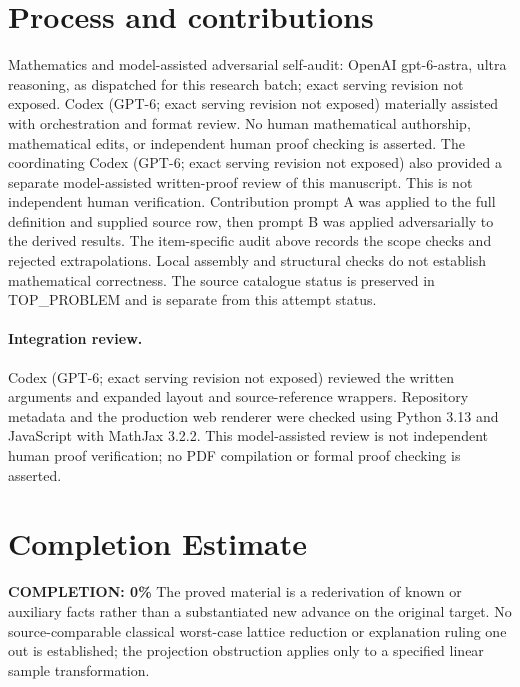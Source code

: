 \documentclass[11pt]{article}
\begin{document}
\section{Process and contributions}
Mathematics and model-assisted adversarial self-audit: OpenAI gpt-6-astra, ultra reasoning, as dispatched for this research batch; exact serving revision not exposed. Codex (GPT-6; exact serving revision not exposed) materially assisted with orchestration and format review. No human mathematical authorship, mathematical edits, or independent human proof checking is asserted.
The coordinating Codex (GPT-6; exact serving revision not exposed) also provided a separate model-assisted written-proof review of this manuscript. This is not independent human verification.
Contribution prompt A was applied to the full definition and supplied source row, then prompt B was applied adversarially to the derived results. The item-specific audit above records the scope checks and rejected extrapolations. Local assembly and structural checks do not establish mathematical correctness. The source catalogue status is preserved in TOP\_PROBLEM and is separate from this attempt status.
\paragraph{Integration review.} Codex (GPT-6; exact serving revision not exposed) reviewed the written arguments and expanded layout and source-reference wrappers. Repository metadata and the production web renderer were checked using Python 3.13 and JavaScript with MathJax 3.2.2. This model-assisted review is not independent human proof verification; no PDF compilation or formal proof checking is asserted.

\section{Completion Estimate}
\noindent\textbf{COMPLETION: 0\%}
The proved material is a rederivation of known or auxiliary facts rather than a substantiated new advance on the original target. No source-comparable classical worst-case lattice reduction or explanation ruling one out is established; the projection obstruction applies only to a specified linear sample transformation.
\end{document}
